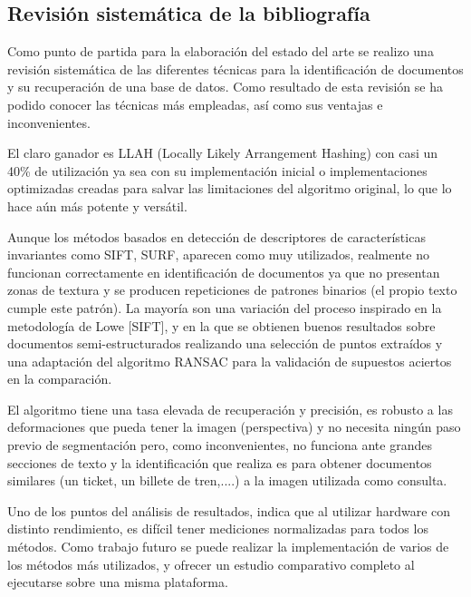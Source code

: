 \subsection{Revisión sistemática de la bibliografía}
Como punto de partida para la elaboración del estado del arte se realizo una revisión sistemática de las diferentes técnicas para la identificación de documentos y su recuperación de una base de datos. Como resultado de esta revisión se ha podido conocer las técnicas más empleadas, así como sus ventajas e inconvenientes. 

El claro ganador es LLAH (Locally Likely Arrangement Hashing) con casi un 40\% de utilización ya sea con su implementación inicial o implementaciones optimizadas creadas para salvar las limitaciones del algoritmo original, lo que lo hace aún más potente y versátil.

Aunque los métodos basados en detección de descriptores de características invariantes como SIFT, SURF, aparecen como muy utilizados, realmente no funcionan correctamente en identificación de documentos ya que no presentan zonas de textura y se producen repeticiones de patrones binarios (el propio texto cumple este patrón). La mayoría son una variación del proceso inspirado en la metodología de Lowe [SIFT], y en la que se obtienen buenos resultados sobre documentos semi-estructurados realizando una selección de puntos extraídos y una adaptación del algoritmo RANSAC para la validación de supuestos aciertos en la comparación. 

El algoritmo tiene una tasa elevada de recuperación y precisión, es robusto a las deformaciones que pueda tener la imagen (perspectiva) y no necesita ningún paso previo de segmentación pero, como inconvenientes, no funciona ante grandes secciones de texto y la identificación que realiza es para obtener documentos similares (un ticket, un billete de tren,....) a la imagen utilizada como consulta.

Uno de los puntos del análisis de resultados, indica que al utilizar hardware con distinto rendimiento, es difícil tener mediciones normalizadas para todos los métodos. Como trabajo futuro se puede realizar la implementación de varios de los métodos más utilizados, y ofrecer un estudio comparativo completo al ejecutarse sobre una misma plataforma.

